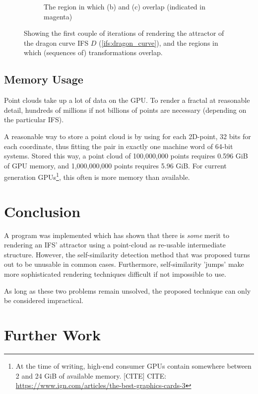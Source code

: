 \documentclass[11pt]{article}
\begin{document}
\begin{enumerate}
\begin{figure}
\begin{subfigure}[b]{0.4\textwidth}
         \caption{The region in which (b) and (c) overlap (indicated in magenta)}
         \label{figure:dragon_curve_d}
     \end{subfigure}
        \caption{Showing the first couple of iterations of rendering the attractor of the dragon curve IFS $D$ (\autoref{ifs:dragon_curve}), and the regions in which (sequences of) transformations overlap.}
        \label{figure:dragon_curve_overlaps}
\end{figure}

\end{enumerate}

\subsection{Memory Usage}
\label{sec:orgdff8cf5}

Point clouds take up a lot of data on the GPU. To render a fractal at reasonable detail, 
hundreds of millions if not billions of points are necessary (depending on the particular IFS).

A reasonable way to store a point cloud is by using for each 2D-point, 32 bits for each coordinate, thus fitting the pair in exactly one machine word of 64-bit systems.
Stored this way, a point cloud of 100,000,000 points requires 0.596 GiB of GPU memory,
and 1,000,000,000 points requires 5.96 GiB.
For current generation GPUs\footnote{At the time of writing, high-end consumer GPUs contain somewhere between 2 and 24 GiB of available memory. [CITE]
CITE: \url{https://www.ign.com/articles/the-best-graphics-cards-3}}, this often is more memory than available.

\section{Conclusion}
\label{sec:orgff3fbfb}
\label{section:conclusion}

A program was implemented which has shown that there is \emph{some} merit to rendering an IFS' attractor using a point-cloud as re-usable intermediate structure.
However, the self-similarity detection method that was proposed turns out to be unusable in common cases.
Furthermore, self-similarity 'jumps' make more sophisticated rendering techniques difficult if not impossible to use.

As long as these two problems remain unsolved, the proposed technique can only be considered impractical.

\section{Further Work}
\label{sec:org447c2ec}
\label{section:further_work}
\end{document}
